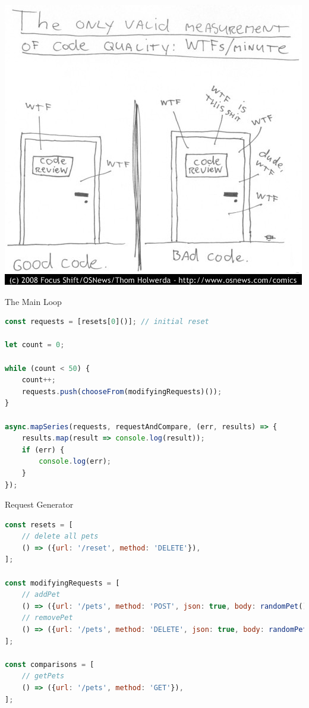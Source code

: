 \begin{frame}[fragile]{}

\begin{center}
\includegraphics[height=.9\textheight]{images/wtfperminute.jpg}
\end{center}

\end{frame}

\begin{frame}[fragile]{The Main Loop}

\begin{lstlisting}[language=JavaScript]
const requests = [resets[0]()]; // initial reset

let count = 0;

while (count < 50) {
    count++;
    requests.push(chooseFrom(modifyingRequests)());
}

async.mapSeries(requests, requestAndCompare, (err, results) => {
    results.map(result => console.log(result));
    if (err) {
        console.log(err);
    }
});
\end{lstlisting}

\end{frame}

\begin{frame}[fragile]{Request Generator}

\begin{lstlisting}[language=JavaScript]
const resets = [
    // delete all pets
    () => ({url: '/reset', method: 'DELETE'}),
];

const modifyingRequests = [
    // addPet
    () => ({url: '/pets', method: 'POST', json: true, body: randomPet()}),
    // removePet
    () => ({url: '/pets', method: 'DELETE', json: true, body: randomPet()})
];

const comparisons = [
    // getPets
    () => ({url: '/pets', method: 'GET'}),
];
\end{lstlisting}

\end{frame}


